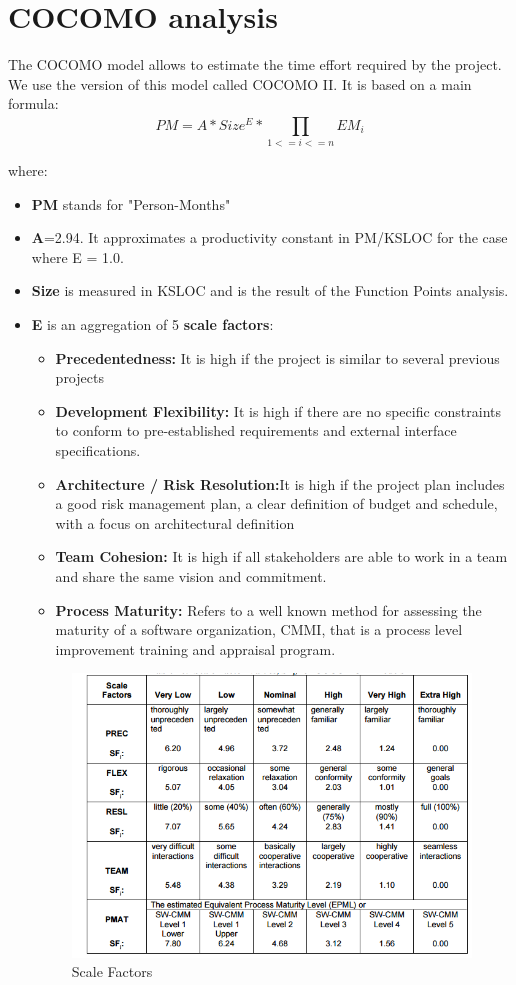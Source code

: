\section{COCOMO analysis}
The COCOMO model allows to estimate the time effort required by the project. We use the version of this model called COCOMO II. It is based on a main formula:
\begin{equation}
PM = A * Size^{E} * \prod_{1<=i<=n}^{} EM_{i} 
\end{equation}

where:
\begin{itemize}
\item \textbf{PM} stands for "Person-Months"
\item \textbf{A}=2.94. It approximates a productivity constant in PM/KSLOC for the case where E = 1.0.
\item \textbf{Size} is measured in KSLOC and is the result of the Function Points analysis.
\item \textbf{E} is an aggregation of 5 \textbf{scale factors}:
	\begin{itemize}[label = {-}]
	\item \textbf{Precedentedness:} It is high if the project is similar to several previous projects
	\item \textbf{Development Flexibility:} It is high if there are no specific constraints to conform to pre-established 		requirements and external interface specifications.
	\item \textbf{Architecture / Risk Resolution:}It is high if the project plan includes a good risk management plan, a clear definition of budget and schedule, with a focus on architectural definition
\item \textbf{Team Cohesion:} It is high if all stakeholders are able to work in a team and share the same vision and commitment.
\item \textbf{Process Maturity:} Refers to a well known method for assessing the maturity of a software organization, CMMI, that is a process level improvement training and appraisal program.
	\end{itemize}
\begin{figure}[H]	
	\centering
	\includegraphics[scale = 0.7]{img/scaleFactors.png}
	\caption{Scale Factors}
\end{figure}


\end{itemize}
